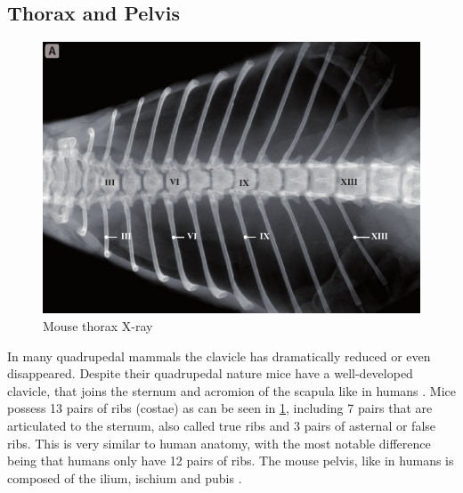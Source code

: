 \subsection{Thorax and Pelvis}\label{s:b-mouse-th-pel}
\begin{figure}[h]
	\centerline{
		\includegraphics[scale=0.6]{images/mouseThorax.png}}
	\caption{Mouse thorax X-ray \cite{harrisonVertebralLandmarksIdentification2013}}\label{fig:mouseThorax}
\end{figure}

\noindent
In many quadrupedal mammals the clavicle has dramatically reduced or even disappeared.
Despite their quadrupedal nature mice have a well-developed clavicle,
that joins the sternum and acromion of the scapula like in humans \cite{ruberteBridgingMouseHuman2023}.
Mice possess 13 pairs of ribs (costae) as can be seen in \cref{fig:mouseThorax}, including 7 pairs that are articulated to the sternum, also called true ribs
and 3 pairs of asternal or false ribs.
This is very similar to human anatomy, with the most notable difference being that humans only have 12 pairs of ribs.
The mouse pelvis, like in humans is composed of the ilium, ischium and pubis \cite{platzerTaschenatlasAnatomieBd2013,ruberteMorphologicalMousePhenotyping2017,halleOpenAnatomyBrowser2017}.


